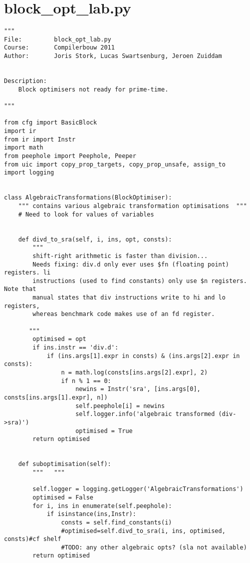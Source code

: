 \newpage
\section{block\_opt\_lab.py}
%
\begin{lstlisting}
""" 
File:         block_opt_lab.py
Course:       Compilerbouw 2011
Author:       Joris Stork, Lucas Swartsenburg, Jeroen Zuiddam


Description:
    Block optimisers not ready for prime-time.

"""

from cfg import BasicBlock
import ir
from ir import Instr
import math
from peephole import Peephole, Peeper
from uic import copy_prop_targets, copy_prop_unsafe, assign_to
import logging


class AlgebraicTransformations(BlockOptimiser):
    """ contains various algebraic transformation optimisations  """
    # Need to look for values of variables


    def divd_to_sra(self, i, ins, opt, consts):
        """ 
        shift-right arithmetic is faster than division... 
        Needs fixing: div.d only ever uses $fn (floating point) registers. li
        instructions (used to find constants) only use $n registers. Note that
        manual states that div instructions write to hi and lo registers,
        whereas benchmark code makes use of an fd register.
       
       """
        optimised = opt
        if ins.instr == 'div.d':
            if (ins.args[1].expr in consts) & (ins.args[2].expr in consts):
                n = math.log(consts[ins.args[2].expr], 2)
                if n % 1 == 0:
                    newins = Instr('sra', [ins.args[0], consts[ins.args[1].expr], n])
                    self.peephole[i] = newins
                    self.logger.info('algebraic transformed (div->sra)')
                    optimised = True
        return optimised


    def suboptimisation(self):
        """   """
        
        self.logger = logging.getLogger('AlgebraicTransformations')
        optimised = False
        for i, ins in enumerate(self.peephole):
            if isinstance(ins,Instr):
                consts = self.find_constants(i)
                #optimised=self.divd_to_sra(i, ins, optimised, consts)#cf shelf 
                #TODO: any other algebraic opts? (sla not available)
        return optimised




\end{lstlisting}
